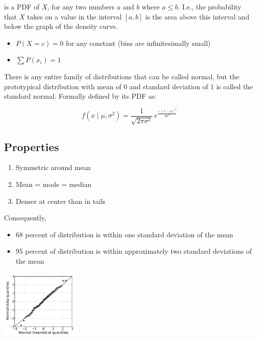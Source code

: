 is a PDF of $X$, for any two numbers $a$ and $b$ where $a \leq b$. I.e., the probability that $X$ takes on a value in the interval $[a, b]$ is the area above this interval and below the graph of the density curve.

\begin{itemize}
	\item $P(X=c) = 0$ for any constant (bins are infinitesimally small)
	\item $\sum P(x_i) = 1$
\end{itemize}


\hformbar




There is any entire family of distributions that can be called normal, but the
prototypical distribution with mean of $0$ and standard deviation of $1$ is
called the standard normal. Formally defined by its PDF as:

\begin{equation}
  f(x \mid \mu, \sigma^2) = \frac{1}{\sqrt{2 \pi \sigma^2}} \, e^{ \frac{-(x - \mu)^2}{2 \sigma^2}}
\end{equation}

\subsection*{Properties}

\begin{enumerate}
	\item Symmetric around mean
	\item Mean = mode = median
	\item Denser at center than in tails
\end{enumerate}

Consequently,

\begin{itemize}
	\item 68 percent of distribution is within one standard deviation of the mean
	\item 95 percent of distribution is within approximately two standard deviations of the mean
\end{itemize}
\hformbar




\begin{center}
    \includegraphics[width=1.5in]{normal_qq}
\end{center}

